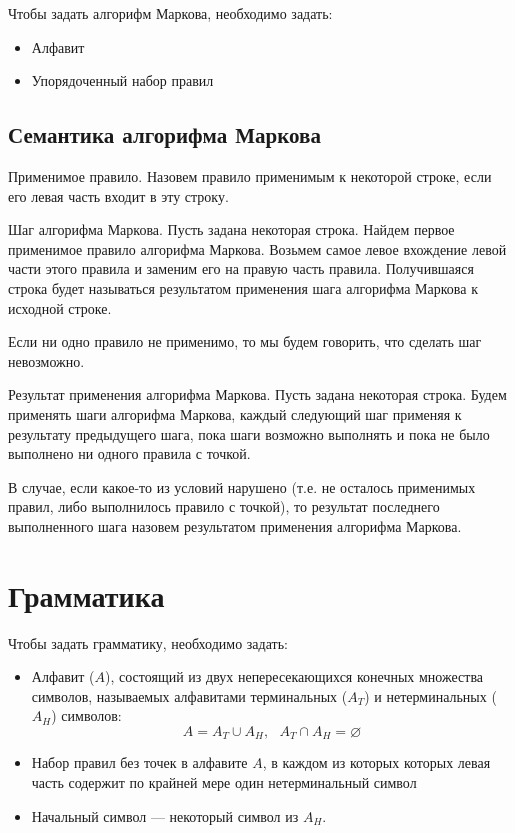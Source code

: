 \documentclass[12pt,a4paper,oneside]{article}
\begin{document}
\begin{definition}Чтобы задать алгорифм Маркова, необходимо задать:
\begin{itemize}
\item Алфавит
\item Упорядоченный набор правил
\end{itemize}
\end{definition}

\subsection{Семантика алгорифма Маркова}

\begin{definition}Применимое правило.
Назовем правило применимым к некоторой строке, если его левая часть входит в
эту строку.
\end{definition}

\begin{definition}Шаг алгорифма Маркова. 
Пусть задана некоторая строка. Найдем первое применимое правило 
алгорифма Маркова. Возьмем самое левое вхождение левой части этого
правила и заменим его на правую часть правила. 
Получившаяся строка будет называться результатом применения шага
алгорифма Маркова к исходной строке.

Если ни одно правило не применимо, то мы будем говорить, что 
сделать шаг невозможно.
\end{definition}

\begin{definition}Результат применения алгорифма Маркова.
Пусть задана некоторая строка. Будем применять шаги алгорифма Маркова,
каждый следующий шаг применяя к результату предыдущего шага,
пока шаги возможно выполнять и пока не было выполнено ни одного правила с точкой.

В случае, если какое-то из условий нарушено (т.е. не осталось применимых 
правил, либо выполнилось правило с точкой), то результат последнего
выполненного шага назовем результатом применения алгорифма Маркова.
\end{definition}

\section{Грамматика}

\begin{definition}
Чтобы задать грамматику, необходимо задать:
\begin{itemize}
\item Алфавит ($A$), состоящий из двух непересекающихся конечных 
множества символов, называемых 
алфавитами терминальных ($A_T$) и нетерминальных ($A_H$) символов:
$$A = A_T \cup A_H, ~~~ A_T \cap A_H = \varnothing$$
\item Набор правил без точек в алфавите $A$, в каждом из которых которых левая часть 
содержит по крайней мере один нетерминальный символ
\item Начальный символ --- некоторый символ из $A_H$.
\end{itemize}
\end{definition} 
\end{document}
